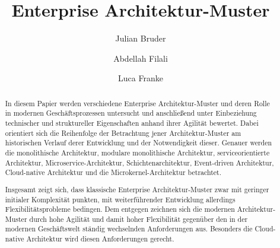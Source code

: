 \documentclass[acmtog]{acmart}
\begin{document}
\title{Enterprise Architektur-Muster}

\author{Julian Bruder}
\author{Abdellah Filali}
\authornotemark[1]
\author{Luca Franke}
\authornotemark[1]
\renewcommand{\shortauthors}{Bruder, Filali, Franke}

\begin{abstract}
In diesem Papier werden verschiedene Enterprise Architektur-Muster und deren Rolle in modernen Geschäftsprozessen untersucht
und anschließend unter Einbeziehung technischer und struktureller Eigenschaften anhand ihrer Agilität bewertet.
Dabei orientiert sich die Reihenfolge der Betrachtung jener Architektur-Muster am historischen Verlauf derer Entwicklung und der Notwendigkeit dieser.
Genauer werden die monolithische Architektur, modulare monolithische Architektur, serviceorientierte Architektur, Microservice-Architektur, Schichtenarchitektur,
Event-driven Architektur, Cloud-native Architektur und die Microkernel-Architektur betrachtet.

Insgesamt zeigt sich, dass klassische Enterprise Architektur-Muster zwar mit geringer initialer Komplexität punkten,
mit weiterführender Entwicklung allerdings Flexibilitätsprobleme bedingen.
Dem entgegen zeichnen sich die modernen Architektur-Muster durch hohe Agilität und damit hoher Flexibilität gegenüber den in der modernen Geschäftswelt ständig
wechselnden Anforderungen aus.
Besonders die Cloud-native Architektur wird diesen Anforderungen gerecht.
\end{abstract}
\end{document}
